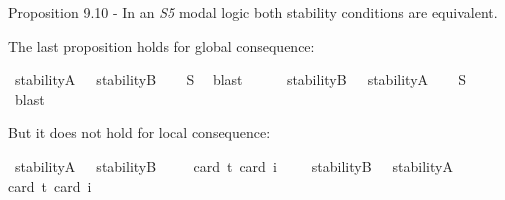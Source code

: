 \begin{isabellebody}
\begin{isamarkuptext}%
Proposition 9.10 - In an \emph{S5} modal logic both stability conditions are equivalent.%
\end{isamarkuptext}\isamarkuptrue%
%
\begin{isamarkuptext}%
The last proposition holds for global consequence:%
\end{isamarkuptext}\isamarkuptrue%
\isamarkupfalse%
\ {\isachardoublequoteopen}{\isasymlfloor}stabilityA\ {\isacharparenleft}{\isasymtau}{\isacharcolon}{\isacharcolon}{\isasymup}{\isasymlangle}{\isasymzero}{\isasymrangle}{\isacharparenright}{\isasymrfloor}\ {\isasymlongrightarrow}\ {\isasymlfloor}stabilityB\ {\isasymtau}{\isasymrfloor}{\isachardoublequoteclose}%
\ %
%
\isamarkupfalse%
\ S{}\ \isamarkupfalse%
\ blast%
%
%
\ \ \ \ \isanewline
{}\isamarkupfalse%
\ {\isachardoublequoteopen}{\isasymlfloor}stabilityB\ {\isacharparenleft}{\isasymtau}{\isacharcolon}{\isacharcolon}{\isasymup}{\isasymlangle}{\isasymzero}{\isasymrangle}{\isacharparenright}{\isasymrfloor}\ {\isasymlongrightarrow}\ {\isasymlfloor}stabilityA\ {\isasymtau}{\isasymrfloor}{\isachardoublequoteclose}%
\ %
%
\isamarkupfalse%
\ S{}\ \isamarkupfalse%
\ blast%
%
%
%
\begin{isamarkuptext}%
But it does not hold for local consequence:%
\end{isamarkuptext}\isamarkuptrue%
\isamarkupfalse%
\ {\isachardoublequoteopen}{\isasymlfloor}stabilityA\ {\isacharparenleft}{\isasymtau}{\isacharcolon}{\isacharcolon}{\isasymup}{\isasymlangle}{\isasymzero}{\isasymrangle}{\isacharparenright}\ \isactrlbold {\isasymrightarrow}\ stabilityB\ {\isasymtau}{\isasymrfloor}{\isachardoublequoteclose}\ \isanewline
\ \ \isamarkupfalse%
{\isacharbrackleft}card\ {\isacharprime}t{\isacharequal}{}{\isacharcomma}\ card\ i{\isacharequal}{}{\isacharbrackright}%
\ %
%
\isamarkupfalse%
\ %
%
%
%
\isanewline
{}\isamarkupfalse%
\ {\isachardoublequoteopen}{\isasymlfloor}stabilityB\ {\isacharparenleft}{\isasymtau}{\isacharcolon}{\isacharcolon}{\isasymup}{\isasymlangle}{\isasymzero}{\isasymrangle}{\isacharparenright}\ \isactrlbold {\isasymrightarrow}\ stabilityA\ {\isasymtau}{\isasymrfloor}{\isachardoublequoteclose}\ \isanewline
\ \ \isamarkupfalse%
{\isacharbrackleft}card\ {\isacharprime}t{\isacharequal}{}{\isacharcomma}\ card\ i{\isacharequal}{}{\isacharbrackright}%

\end{isabellebody}
